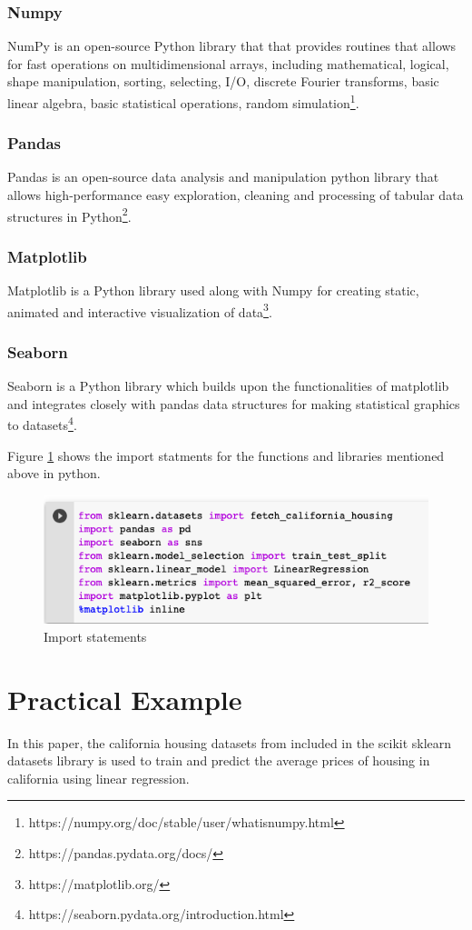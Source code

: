 \documentclass[conference]{IEEEtran}
\begin{document}
\subsubsection{Numpy}
NumPy is an open-source Python library that that provides routines that allows for fast operations on multidimensional arrays, including mathematical, logical, shape manipulation, sorting, selecting, I/O, discrete Fourier transforms, basic linear algebra, basic statistical operations, random simulation\footnote{https://numpy.org/doc/stable/user/whatisnumpy.html}.
\subsubsection{Pandas}
Pandas is an open-source data analysis and manipulation python library that allows high-performance easy exploration, cleaning and processing of tabular data structures in Python\footnote{https://pandas.pydata.org/docs/}.
\subsubsection{Matplotlib}
Matplotlib is a Python library used along with Numpy for creating static, animated and interactive visualization of data\footnote{https://matplotlib.org/}.
\subsubsection{Seaborn}
Seaborn is a Python library which builds upon the functionalities of matplotlib and integrates closely with pandas data structures for making statistical graphics to datasets\footnote{https://seaborn.pydata.org/introduction.html}.

 Figure \ref{fig:placeholder} shows the import statments for the functions and libraries mentioned above in python.
 \begin{figure}[htbp]
	\centerline{\includegraphics [scale=0.45]{figures/import_statements.png}}
	\caption{Import statements}
	\label{fig:placeholder}
\end{figure}
\section{Practical Example}
In this paper, the california housing datasets from \cite{KELLEYPACE1997291} included in the scikit sklearn datasets library is used to  train and predict the average prices of housing in california using linear regression. 
\end{document}
